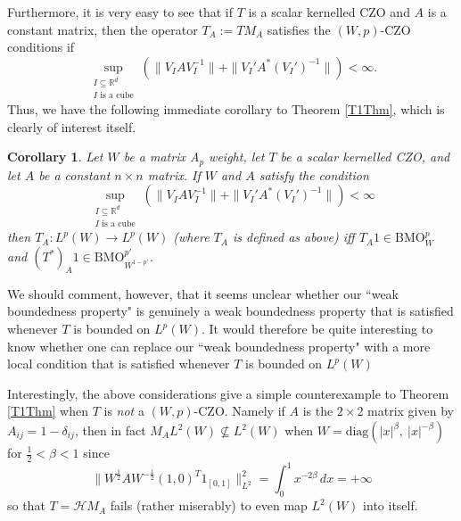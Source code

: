 \documentclass[12pt,reqno ]{amsart}
\numberwithin{equation}{section}
\newtheorem{corollary}[theorem]{Corollary}
\theoremstyle{definition}
\newcommand{\Rd}{\ensuremath{\mathbb{R}^d}}
\renewcommand{\H}{\ensuremath{\mathcal{H}}}
\newcommand{\BMOW}{\ensuremath{{\text{BMO}}_W ^p}}
\newcommand{\BMOWq}{\ensuremath{{\text{BMO}}_{W^{1 - p'}}^{p'} }}
\begin{document}
Furthermore, it is very easy to see that if $T$ is a scalar kernelled CZO  and $A$ is a constant matrix, then the operator $T_A := T M_A $  satisfies the $(W, p)$-CZO conditions if \begin{equation*} \sup_{\substack {I \subseteq \Rd \\ I \text{ is a cube}}} ( \|V_I A V_I ^{-1}\|  + \|V_I ' A^* (V_I ')^{-1}\|) < \infty.   \end{equation*}  Thus, we have the following immediate corollary to Theorem \ref{T1Thm}, which is clearly of interest itself.


 \begin{corollary} \label{T1SpecialCor} Let  $W$ be a matrix A${}_p$ weight, let  $T$ be a scalar kernelled CZO,  and let $A$ be a constant $n \times n$ matrix.  If $W$ and $A$ satisfy the condition \begin{equation*} \sup_{\substack {I \subseteq \Rd \\ I \text{ is a cube}}} ( \|V_I A V_I ^{-1}\|  + \|V_I ' A^* (V_I ')^{-1}\|) < \infty   \end{equation*} then $T_A : L^p(W) \rightarrow L^p(W)$ (where $T_A$ is defined as above) iff $T_A 1 \in \BMOW$ and $(T^*)_A  1 \in \BMOWq$. \end{corollary}


We should comment, however, that it seems unclear whether our ``weak boundedness property" is genuinely a weak boundedness property that is satisfied whenever $T$ is bounded on $L^p(W)$.  It would therefore be quite interesting to know whether one can replace our ``weak boundedness property" with a more local condition that is satisfied whenever $T$ is bounded on $L^p(W)$

Interestingly, the above considerations give a simple counterexample to Theorem \ref{T1Thm} when $T$ is \textit{not} a $(W, p)$-CZO.  Namely if $A$ is the $2 \times 2$ matrix given by $A_{ij} = 1 - \delta_{ij}$, then in fact $M_A  L^2(W) \nsubseteq L^2(W)$ when $W = \text{diag}(|x|^\beta, \ |x|^{-\beta})$ for $\frac{1}{2} < \beta < 1$ since \begin{equation*} \|W^\frac12 A W^{-\frac12} (1, 0)^T 1_{[0, 1]} \|_{L^2} ^2 = \int_0^1 x^{-2\beta} \, dx = + \infty \end{equation*} so that $T =\H M_A$ fails (rather miserably) to even map $L^2(W)$ into itself.
\end{document}
